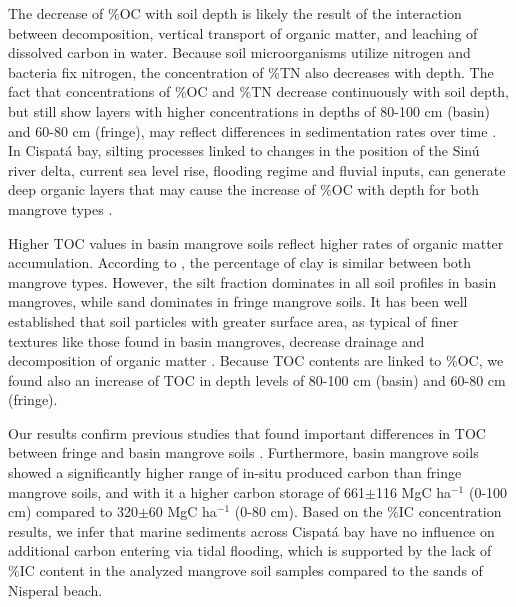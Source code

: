 The decrease of \%OC with soil depth is likely the result of the interaction between decomposition, vertical transport of organic matter, and leaching of dissolved carbon in water. Because soil microorganisms utilize nitrogen and bacteria fix nitrogen, the concentration of \%TN also decreases with depth. The fact that concentrations of \%OC and \%TN decrease continuously with soil depth, but still show layers with higher concentrations in depths of 80-100 cm (basin) and 60-80 cm (fringe), may reflect differences in sedimentation rates over time \citep{Bolivar2015}. In Cispat\'{a} bay, silting processes linked to changes in the position of the Sin\'{u} river delta, current sea level rise, flooding regime and fluvial inputs, can generate deep organic layers that may cause the increase of \%OC with depth for both mangrove types \citep{suarez2004}. 

Higher TOC values in basin mangrove soils reflect higher rates of organic matter accumulation. According to  \citet{Bolivar2015}, the percentage of clay is similar between both mangrove types. However, the silt fraction dominates in all soil profiles in basin mangroves, while sand dominates in fringe mangrove soils. It has been well established that soil particles with greater surface area, as typical of finer textures like those found in basin mangroves, decrease drainage and decomposition of organic matter \citep{prasad2008}. Because TOC contents are linked to \%OC, we found also an increase of TOC in depth levels of 80-100 cm (basin) and 60-80 cm (fringe).

Our results confirm previous studies that found important differences in TOC between fringe and basin mangrove soils \citep{Bolivar2015}. Furthermore, basin mangrove soils showed a significantly higher range of in-situ produced carbon than fringe mangrove soils, and with it a higher carbon storage of 661$\pm$116 MgC ha$^{-1}$ (0-100 cm) compared to 320$\pm$60 MgC ha$^{-1}$ (0-80 cm). Based on the \%IC concentration results, we infer that marine sediments across Cispat\'{a} bay have no influence on additional carbon entering via tidal flooding, which is supported by the lack of \%IC content in the analyzed mangrove soil samples compared to the sands of Nisperal beach.

